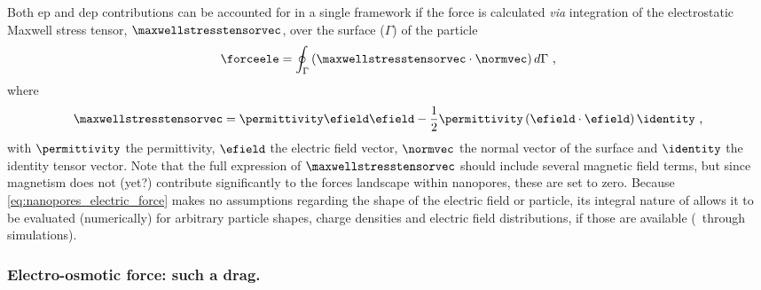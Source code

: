 Both \gls{ep} and \gls{dep} contributions can be accounted for in a single framework if the force is
calculated \textit{via} integration of the electrostatic Maxwell stress tensor, $\maxwellstresstensorvec$,
over the surface ($\Gamma$) of the particle~\cite{Ai-2011}
%
\begin{equation}\label{eq:nanopores_electric_force}
  \forceele = \oint_{\Gamma} \left( \maxwellstresstensorvec \cdot \normvec \right) d\Gamma
  \text{ ,}
\end{equation}
%
where
%
\begin{equation}\label{eq:nanopores_maxwell_stresstensor}
  \maxwellstresstensorvec = \permittivity \efield \efield
                            - \dfrac{1}{2} \permittivity \left( \efield \cdot \efield \right) \identity
  \text{ ,}
\end{equation}
%
with $\permittivity$ the permittivity, $\efield$ the electric field vector, $\normvec$ the normal vector of
the surface and $\identity$ the identity tensor vector. Note that the full expression of
$\maxwellstresstensorvec$ should include several magnetic field terms, but since magnetism does not (yet?)
contribute significantly to the forces landscape within nanopores, these are set to zero. Because
\cref{eq:nanopores_electric_force} makes no assumptions regarding the shape of the electric field or particle,
its integral nature of allows it to be evaluated (numerically) for arbitrary particle shapes, charge densities
and electric field distributions, if those are available (\eg~through simulations).


\subsubsection{Electro-osmotic force: such a drag.}
%

